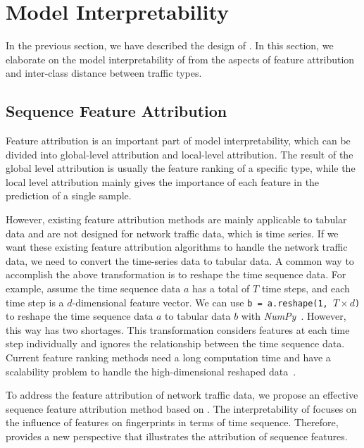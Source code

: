 \section{Model Interpretability}
\label{sec:Model_Interpretability}
In the previous section, we have described the design of \sys. In this section, we elaborate on the model interpretability of \sys from the aspects of feature attribution and inter-class distance between traffic types. 

\subsection{Sequence Feature Attribution}
\label{sec:Sequence_Feature_Ranking}
Feature attribution is an important part of model interpretability, which can be divided into global-level attribution and local-level attribution.
The result of the global level attribution is usually the feature ranking of a specific type, while the local level attribution mainly gives the importance of each feature in the prediction of a single sample.

However, existing feature attribution methods are mainly applicable to tabular data and are not designed for network traffic data, which is time series.
If we want these existing feature attribution algorithms to handle the network traffic data, we need to convert the time-series data to tabular data.
A common way to accomplish the above transformation is to reshape the time sequence data.
For example, assume the time sequence data $a$ has a total of $T$ time steps, and each time step is a $d$-dimensional feature vector. We can use \texttt{b = a.reshape(1, $T\times d$)} to reshape the time sequence data $a$ to tabular data $b$ with \textit{NumPy}~\cite{harris2020array}. 
However, this way has two shortages. 
\first This transformation considers features at each time step individually and ignores the relationship between the time sequence data.
\second Current feature ranking methods need a long computation time and have a scalability problem to handle the high-dimensional reshaped data~\cite{zou2016novel}. 

To address the feature attribution of network traffic data, we propose an effective sequence feature attribution method based on \sys.
The interpretability of \sys focuses on the influence of features on fingerprints in terms of time sequence. 
Therefore, \sys provides a new perspective that illustrates the attribution of sequence features.

